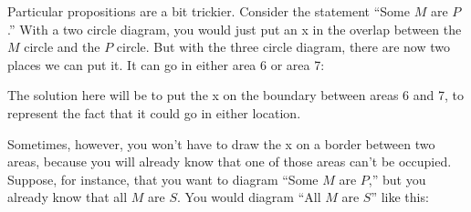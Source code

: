 Particular propositions are a bit trickier. Consider the statement ``Some $M$ are $P$.'' With a two circle diagram, you would just put an x in the overlap between the $M$ circle and the $P$ circle. But with the three circle diagram, there are now two places we can put it. It can go in either area 6 or area 7: 

\begin{center}
\end{center}

The solution here will be to put the x on the boundary between areas 6 and 7, to represent the fact that it could go in either location. 

\begin{center}
\end{center}

Sometimes, however, you won't have to draw the x on a border between two areas, because you will already know that one of those areas can't be occupied. Suppose, for instance, that you want to diagram ``Some $M$ are $P$,'' but you already know that all $M$ are $S$. You would diagram ``All $M$ are $S$'' like this:

\begin{center}
\end{center}

